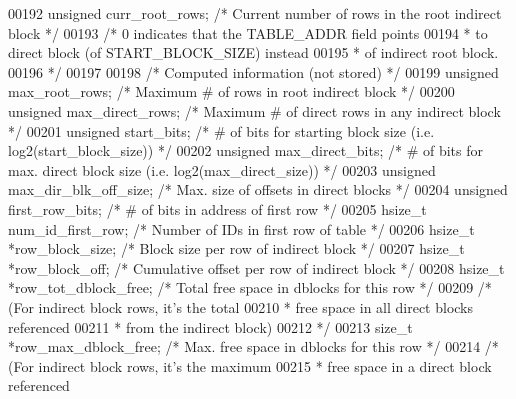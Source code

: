 \begin{DoxyCode}
00192     \textcolor{keywordtype}{unsigned}    curr\_root\_rows; \textcolor{comment}{/* Current number of rows in the root indirect block */}
00193                                 \textcolor{comment}{/* 0 indicates that the TABLE\_ADDR field points}
00194 \textcolor{comment}{                                 * to direct block (of START\_BLOCK\_SIZE) instead}
00195 \textcolor{comment}{                                 * of indirect root block.}
00196 \textcolor{comment}{                                 */}
00197 
00198     \textcolor{comment}{/* Computed information (not stored) */}
00199     \textcolor{keywordtype}{unsigned}    max\_root\_rows;      \textcolor{comment}{/* Maximum # of rows in root indirect block */}
00200     \textcolor{keywordtype}{unsigned}    max\_direct\_rows;    \textcolor{comment}{/* Maximum # of direct rows in any indirect block */}
00201     \textcolor{keywordtype}{unsigned}    start\_bits;         \textcolor{comment}{/* # of bits for starting block size (i.e. log2(start\_block\_size)) */}
00202     \textcolor{keywordtype}{unsigned}    max\_direct\_bits;    \textcolor{comment}{/* # of bits for max. direct block size (i.e. log2(max\_direct\_size)) */}
00203     \textcolor{keywordtype}{unsigned}    max\_dir\_blk\_off\_size;   \textcolor{comment}{/* Max. size of offsets in direct blocks */}
00204     \textcolor{keywordtype}{unsigned}    first\_row\_bits;     \textcolor{comment}{/* # of bits in address of first row */}
00205     hsize\_t     num\_id\_first\_row;   \textcolor{comment}{/* Number of IDs in first row of table */}
00206     hsize\_t     *row\_block\_size;    \textcolor{comment}{/* Block size per row of indirect block */}
00207     hsize\_t     *row\_block\_off;     \textcolor{comment}{/* Cumulative offset per row of indirect block */}
00208     hsize\_t     *row\_tot\_dblock\_free;   \textcolor{comment}{/* Total free space in dblocks for this row */}
00209                                     \textcolor{comment}{/* (For indirect block rows, it's the total}
00210 \textcolor{comment}{                                     * free space in all direct blocks referenced}
00211 \textcolor{comment}{                                     * from the indirect block)}
00212 \textcolor{comment}{                                     */}
00213     \textcolor{keywordtype}{size\_t}      *row\_max\_dblock\_free;   \textcolor{comment}{/* Max. free space in dblocks for this row */}
00214                                     \textcolor{comment}{/* (For indirect block rows, it's the maximum}
00215 \textcolor{comment}{                                     * free space in a direct block referenced}

\end{DoxyCode}
